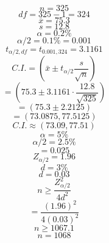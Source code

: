 \documentclass{article}
\begin{document}
    $$n = 325$$
$$df = 325 - 1 = 324$$
$$\bar{x} = 75.3$$
$$s = 12.8$$
$$\alpha = 0.2\%$$
$$\alpha/2 = 0.1\% = 0.001$$
$$t_{\alpha/2, df} = t_{0.001, 324} = 3.1161$$
$$C.I. = \left(\bar{x} \pm t_{\alpha/2} \frac{s}{\sqrt{n}}\right)$$
$$= \left(75.3 \pm 3.1161 \cdot \frac{12.8}{\sqrt{325}}\right)$$
$$= (75.3 \pm 2.2125)$$
$$= (73.0875, 77.5125)$$
$$C.I. \approx (73.09, 77.51)$$
$$\alpha = 5\%$$
$$\alpha/2 = 2.5\%$$
$$= 0.025$$
$$Z_{\alpha/2} = 1.96$$
$$d = 3\%$$
$$d = 0.03$$
$$n \ge \frac{Z_{\alpha/2}^2}{4d^2}$$
$$= \frac{(1.96)^2}{4(0.03)^2}$$
$$n \ge 1067.1$$
$$n = 1068$$

    
\end{document}
